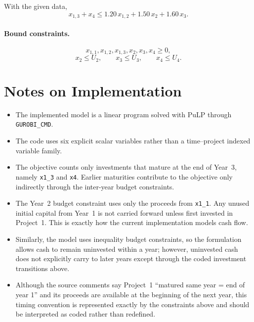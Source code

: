 With the given data,
\[
x_{1,3} + x_4 \le 1.20\,x_{1,2} + 1.50\,x_2 + 1.60\,x_3.
\]

\paragraph{Bound constraints.}
\[
x_{1,1},x_{1,2},x_{1,3},x_2,x_3,x_4 \ge 0,
\]
\[
x_2 \le U_2,\qquad x_3 \le U_3,\qquad x_4 \le U_4.
\]

\section*{Notes on Implementation}

\begin{itemize}
    \item The implemented model is a linear program solved with PuLP through \texttt{GUROBI\_CMD}.
    \item The code uses six explicit scalar variables rather than a time--project indexed variable family.
    \item The objective counts only investments that mature at the end of Year~3, namely \texttt{x1\_3} and \texttt{x4}. Earlier maturities contribute to the objective only indirectly through the inter-year budget constraints.
    \item The Year~2 budget constraint uses only the proceeds from \texttt{x1\_1}. Any unused initial capital from Year~1 is not carried forward unless first invested in Project~1. This is exactly how the current implementation models cash flow.
    \item Similarly, the model uses inequality budget constraints, so the formulation allows cash to remain uninvested within a year; however, uninvested cash does not explicitly carry to later years except through the coded investment transitions above.
    \item Although the source comments say Project~1 ``matured same year = end of year 1'' and its proceeds are available at the beginning of the next year, this timing convention is represented exactly by the constraints above and should be interpreted as coded rather than redefined.
\end{itemize}
